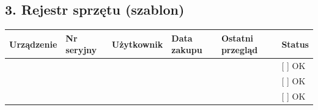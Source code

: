 \documentclass[12pt,a4paper]{article}
\begin{document}
\subsection{3. Rejestr sprzętu
(szablon)}\label{rejestr-sprzux119tu-szablon}

\begin{longtable}[]{@{}>{\raggedright\arraybackslash}p{}>{\raggedright\arraybackslash}p{}>{\raggedright\arraybackslash}p{}>{\raggedright\arraybackslash}p{}>{\raggedright\arraybackslash}p{}>{\raggedright\arraybackslash}p{}@{}}
\toprule\noalign{}
Urządzenie & Nr seryjny & Użytkownik & Data zakupu & Ostatni przegląd &
Status \\
\midrule\noalign{}
\endhead
\bottomrule\noalign{}
\endlastfoot
\underline{\hspace{2cm}} & \underline{\hspace{2cm}} &
\underline{\hspace{2cm}} & \underline{\hspace{2cm}} &
\underline{\hspace{2cm}} & {[} {]} OK \\
\underline{\hspace{2cm}} & \underline{\hspace{2cm}} &
\underline{\hspace{2cm}} & \underline{\hspace{2cm}} &
\underline{\hspace{2cm}} & {[} {]} OK \\
\underline{\hspace{2cm}} & \underline{\hspace{2cm}} &
\underline{\hspace{2cm}} & \underline{\hspace{2cm}} &
\underline{\hspace{2cm}} & {[} {]} OK \\
\end{longtable}
\end{document}
